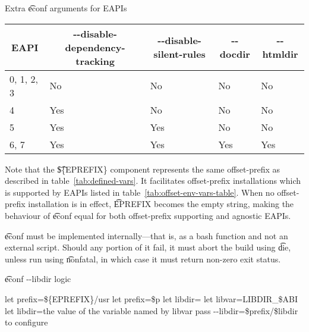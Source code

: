 \begin{description}
    \begin{centertable}{Extra \t{econf} arguments for EAPIs}
        \label{tab:econf-options-table}
        \begin{tabular}{lllll}
          \toprule
          \multicolumn{1}{c}{\textbf{EAPI}} &
          \multicolumn{1}{c}{\textbf{-{}-disable-dependency-tracking}} &
          \multicolumn{1}{c}{\textbf{-{}-disable-silent-rules}} &
          \multicolumn{1}{c}{\textbf{-{}-docdir}} &
          \multicolumn{1}{c}{\textbf{-{}-htmldir}} \\
          \midrule
          0, 1, 2, 3        & No  & No  & No  & No  \\
          4                 & Yes & No  & No  & No  \\
          5                 & Yes & Yes & No  & No  \\
          6, 7              & Yes & Yes & Yes & Yes \\
          \bottomrule
        \end{tabular}
    \end{centertable}

    Note that the \t{\$\{EPREFIX\}} component represents the same offset-prefix as described in
    table~\ref{tab:defined-vars}. It facilitates offset-prefix installations which is supported by
    EAPIs listed in table~\ref{tab:offset-env-vars-table}. When no offset-prefix installation is in
    effect, \t{EPREFIX} becomes the empty string, making the behaviour of \t{econf} equal for both
    offset-prefix supporting and agnostic EAPIs.

    \t{econf} must be implemented internally---that is, as a bash function and not an external
    script. Should any portion of it fail, it must abort the build using \t{die}, unless run using
    \t{nonfatal}, in which case it must return non-zero exit status.

\begin{algorithm}
\caption{\t{econf -{}-libdir} logic} \label{alg:econf-libdir}
\begin{algorithmic}[1]
\STATE let prefix=\$\{EPREFIX\}/usr
    \STATE let prefix=\$p
\ENDIF
\STATE let libdir=
    \STATE let libvar=LIBDIR_\$ABI
        \STATE let libdir=the value of the variable named by libvar
    \ENDIF
\ENDIF
{}
    \STATE pass -{}-libdir=\$prefix/\$libdir to configure
\ENDIF
\end{algorithmic}
\end{algorithm}


\end{description}
